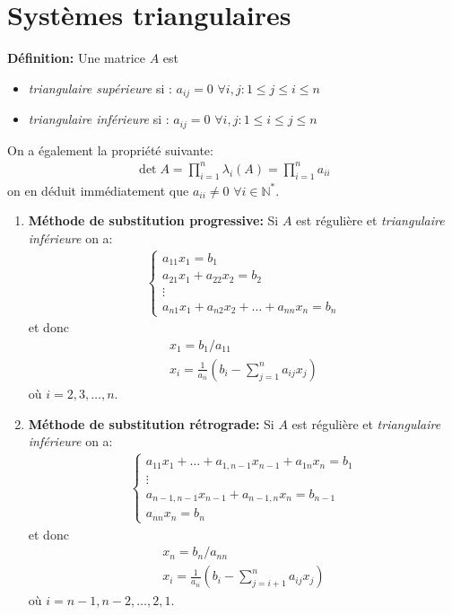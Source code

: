 \section{Systèmes triangulaires}
\textbf{Définition:} Une matrice $A$ est 
\begin{itemize}
	\item \emph{triangulaire supérieure} si : $a_{ij}=0$ $\forall i,j : 1\leq j\leq i \leq n$
	\item \emph{triangulaire inférieure} si : $a_{ij}=0$ $\forall i,j : 1\leq i\leq j \leq n$
\end{itemize}
On a également la propriété suivante:
\begin{eqnarray}
	\det A=\prod_{i=1}^{n}\lambda_i(A)=\prod_{i=1}^na_{ii}
\end{eqnarray}
on en déduit immédiatement que $a_{ii}\neq0$ $\forall i\in\mathbb N^*$.
\begin{enumerate}
	\item \textbf{Méthode de substitution progressive:}
	Si $A$ est régulière et \emph{triangulaire inférieure} on a:
	\begin{eqnarray}
		\begin{cases}
			a_{11}x_1=b_1
			\\
			a_{21}x_1+a_{22}x_2=b_2
			\\
			\vdots
			\\
			a_{n1}x_1+a_{n2}x_2+\dots+a_{nn}x_n=b_n
		\end{cases}
	\end{eqnarray}
	et donc
	\begin{eqnarray}
		x_1=b_1/a_{11}
		\\
		x_i=\frac{1}{a_{ii}}\left(b_i-\sum_{j=1}^na_{ij}x_j\right)
	\end{eqnarray}
	où $i = 2,3,\dots,n$.
	\item \textbf{Méthode de substitution rétrograde:}
	Si $A$ est régulière et \emph{triangulaire inférieure} on a:
	\begin{eqnarray}
		\begin{cases}
			a_{11}x_1+\dots+a_{1,n-1}x_{n-1}+a_{1n}x_n=b_1
			\\
			\vdots
			\\
			a_{n-1,n-1}x_{n-1}+a_{n-1,n}x_n=b_{n-1}
			\\
			a_{nn}x_n=b_n
		\end{cases}
	\end{eqnarray}
	et donc
	\begin{eqnarray}
		x_n=b_n/a_{nn}
		\\
		x_i=\frac{1}{a_{ii}}\left(b_i-\sum_{j=i+1}^na_{ij}x_j\right)
	\end{eqnarray}
	où $i = n-1,n-2,\dots,2,1$.
\end{enumerate}

